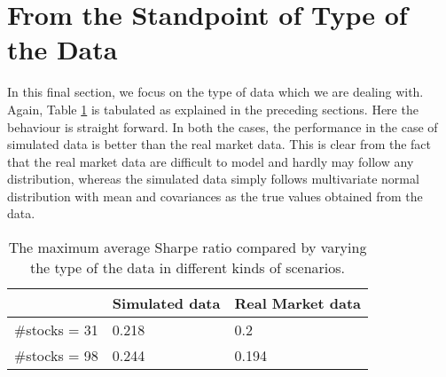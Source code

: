 \section{From the Standpoint of Type of the Data}
In this final section, we focus on the type of data which we are dealing with. Again, Table \ref{tab:data_type} is tabulated as explained in the preceding sections. Here the behaviour is straight forward. In both the cases, the performance in the case of simulated data is better than the real market data. This is clear from the fact that the real market data are difficult to model and hardly may follow any distribution, whereas the simulated data simply follows multivariate normal distribution with mean and covariances as the true values obtained from the data. 
\begin{table}[!h]
    \centering
    \captionsetup{justification=centering}
   \begin{tabular}{||p{4cm}|p{4cm}|p{4cm}||}
   \hline
  & Simulated data & Real Market data \\
  \hline
  \#stocks = 31  & 0.218    &0.2\\
 \#stocks = 98 &   0.244  & 0.194  \\
 \hline
\end{tabular}
    \caption{The maximum average Sharpe ratio compared by varying the type of the data in different kinds of scenarios.}
    \label{tab:data_type}
\end{table}

